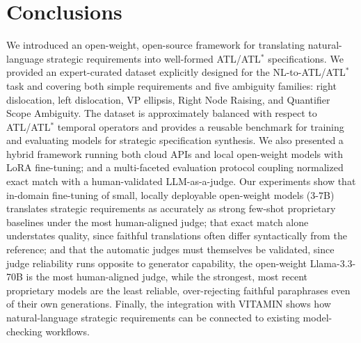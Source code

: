 \section{Conclusions}
\label{sec:conclusions}

We introduced an open-weight, open-source framework for translating natural-language strategic requirements into well-formed ATL/ATL$^\ast$ specifications. We provided an expert-curated dataset explicitly designed for the NL-to-ATL/ATL$^\ast$ task and covering both simple requirements and five ambiguity families: right dislocation, left dislocation, VP ellipsis, Right Node Raising, and Quantifier Scope Ambiguity. The dataset is approximately balanced with respect to ATL/ATL$^\ast$ temporal operators and provides a reusable benchmark for training and evaluating models for strategic specification synthesis. We also presented a hybrid framework running both cloud APIs and local open-weight models with LoRA fine-tuning; and a multi-faceted evaluation protocol coupling normalized exact match with a human-validated LLM-as-a-judge. Our experiments show that in-domain fine-tuning of small, locally deployable open-weight models ($3$-$7$B) translates strategic requirements as accurately as strong few-shot proprietary baselines under the most human-aligned judge; that exact match alone understates quality, since faithful translations often differ syntactically from the reference; and that the automatic judges must themselves be validated, since judge reliability runs opposite to generator capability, the open-weight Llama-3.3-70B is the most human-aligned judge, while the strongest, most recent proprietary models are the least reliable, over-rejecting faithful paraphrases even of their own generations. Finally, the integration with \textsc{VITAMIN} shows how natural-language strategic requirements can be connected to existing model-checking workflows.

